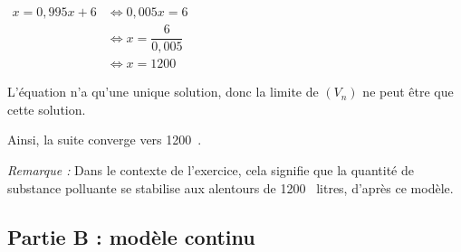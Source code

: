 \documentclass[10pt]{article}
\providecommand{\np}[2][]{{#2~#1}}
\begin{document}
\begin{enumerate}
	$\begin{aligned}
		x = 0,995x + 6
		&\iff 0,005x = 6\\
		&\iff x = \dfrac{6}{0,005}\\
		&\iff x = \np{1200}
	\end{aligned}$

	L'équation n'a qu'une unique solution, donc la limite de $(V_n)$ ne peut être que cette solution.

	Ainsi, la suite converge vers \np{1200}.

	\emph{Remarque :} Dans le contexte de l'exercice, cela signifie que la quantité de substance polluante se stabilise aux alentours de \np{1200} litres, d'après ce modèle.
\end{enumerate}

\subsection*{Partie B : modèle continu}
\end{document}
